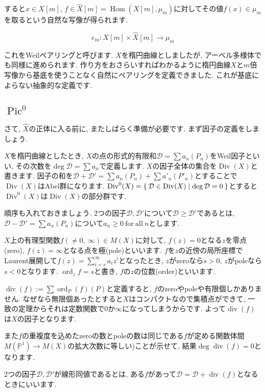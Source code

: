 \documentclass{jsarticle}
\newcommand{\PP}{\mathbb{P}}
\newcommand{\makeop}[1]{\mathop{\mathrm{#1}}\nolimits}
\def\Hom{\makeop{Hom}}
\def\Pic{\makeop{Pic}}
\def\Div{\makeop{Div}}
\def\div{\makeop{div}}
\def\ord{\makeop{ord}}
\theoremstyle{definition}
\numberwithin{theorem}{section}
\begin{document}
すると$x \in X[m]$, $f \in \hat{X}[m] = \Hom(X[m], \mu_m)$に対してその値$f(x) \in \mu_m$を取るという自然な写像が得られます. 

\begin{equation*}
e_m: X[m] \times \hat{X}[m] \rightarrow \mu_m
\end{equation*}

これをWeilペアリングと呼びます. $X$を楕円曲線としましたが, アーベル多様体でも同様に進められます. 作り方をおさらいすればわかるように楕円曲線$X$と$m$倍写像から基底を使うことなく自然にペアリングを定義できました. これが基底によらない抽象的な定義です. 

\subsection{$\Pic^0$}
さて, $\hat{X}$の正体に入る前に, またしばらく準備が必要です. まず因子の定義をしましょう.

$X$を楕円曲線としたとき, $X$の点の形式的有限和$\mathcal{D} = \sum a_n(P_n)$をWeil因子といい, その次数を$\deg \mathcal{D} = \sum a_n$で定義します. $X$の因子全体の集合を$\Div(X)$と書きます. 因子の和を$\mathcal{D} + \mathcal{D}' = \sum a_n(P_n) + \sum a'_n (P'_n)$とすることで$\Div(X)$はAbel群になります. $\Div^0(X) = \Set{\mathcal{D} \in \Div(X) | \deg \mathcal{D} = 0}$とすると$\Div^0(X)$は$\Div(X)$の部分群です. 

順序も入れておきましょう. 2つの因子$\mathcal{D}, \mathcal{D}'$について$\mathcal{D} \geq \mathcal{D}'$であるとは, $\mathcal{D} - \mathcal{D}' = \sum a_n(P_n)$について$a_n \geq 0 \mathrm{\ for\ all\ } n$とします.

$X$上の有理型関数$f(\neq 0,\ \infty) \in M(X)$に対して, $f(z) = 0$となる$z$を零点(zero), $f(z) = \infty$となる点を極(pole)といいます. $f$を$z$の近傍の局所座標でLaurent展開して$f(z) = \sum_{i=s}^\infty a_iz^i$となったとき, $z$がzeroなら$s > 0$, $z$がpoleなら$s < 0$となります. $\ord_z f = s$と書き, $f$の$z$の位数(order)といいます. 

$\div(f) := \sum \ord_P(f) (P)$と定義すると, $f$のzeroやpoleや有限個しかありません. なぜなら無限個あったとすると$X$はコンパクトなので集積点ができて, 一致の定理からそれは定数関数で0か$\infty$になってしまうからです. よって$\div(f)$は$X$の因子となります. 

また$f$の重複度を込めたzeroの数とpoleの数は同じである$f$が定める関数体間$M(\PP^1) \rightarrow M(X)$の拡大次数に等しい)ことが示せて, 結果$\deg \div(f) = 0$となります. 

2つの因子$\mathcal{D}, \mathcal{D}'$が線形同値であるとは, ある$f$があって$\mathcal{D} = \mathcal{D} + \div(f)$となるときにいいます.
\end{document}
